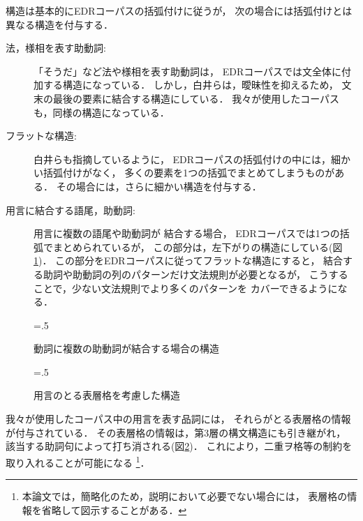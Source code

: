 構造は基本的にEDRコーパスの括弧付けに従うが，
次の場合には括弧付けとは異なる構造を付与する．
\begin{description}
\item[法，様相を表す助動詞: ] 「そうだ」など法や様相を表す助動詞は，
  EDRコーパスでは文全体に付加する構造になっている．
  しかし，白井らは，曖昧性を抑えるため，
  文末の最後の要素に結合する構造にしている．
  我々が使用したコーパスも，同様の構造になっている．
\item[フラットな構造: ] 白井らも指摘しているように，
  EDRコーパスの括弧付けの中には，細かい括弧付けがなく，
  多くの要素を1つの括弧でまとめてしまうものがある．
  その場合には，さらに細かい構造を付与する．
\item[用言に結合する語尾，助動詞: ] 用言に複数の語尾や助動詞が
  結合する場合，
  EDRコーパスでは1つの括弧でまとめられているが，
  この部分は，左下がりの構造にしている(図\ref{fig:verb_struct})．
  この部分をEDRコーパスに従ってフラットな構造にすると，
  結合する助詞や助動詞の列のパターンだけ文法規則が必要となるが，
  こうすることで，少ない文法規則でより多くのパターンを
  カバーできるようになる．
\end{description}

\begin{figure}[tp]
  \centering
  \epsfxsize=.5\textwidth
  \caption{動詞に複数の助動詞が結合する場合の構造}
  \label{fig:verb_struct}
\end{figure}

\begin{figure}[tp]
  \centering
  \epsfxsize=.5\textwidth
  \caption{用言のとる表層格を考慮した構造}
  \label{fig:case}
\end{figure}

我々が使用したコーパス中の用言を表す品詞には，
それらがとる表層格の情報が付与されている．
その表層格の情報は，第3層の構文構造にも引き継がれ，
該当する助詞句によって打ち消される(図\ref{fig:case})．
これにより，二重ヲ格等の制約を取り入れることが可能になる
\footnote{本論文では，簡略化のため，説明において必要でない場合には，
表層格の情報を省略して図示することがある．}．


